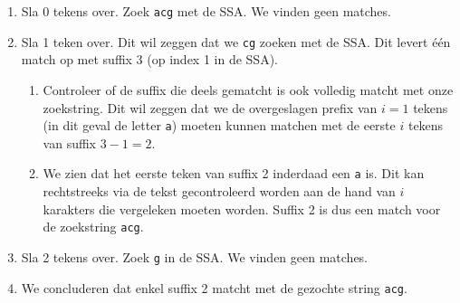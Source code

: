 \begin{enumerate}
    \item Sla 0 tekens over.
    Zoek \texttt{acg} met de SSA\@.
    We vinden geen matches.
    \item Sla 1 teken over.
    Dit wil zeggen dat we \texttt{cg} zoeken met de SSA\@.
    Dit levert één match op met suffix 3 (op index 1 in de SSA).
    \begin{enumerate}
        \item Controleer of de suffix die deels gematcht is ook volledig matcht met onze zoekstring.
        Dit wil zeggen dat we de overgeslagen prefix van $i = 1$ tekens (in dit geval de letter \texttt{a}) moeten kunnen matchen met de eerste $i$ tekens van suffix $3 - 1 = 2$.
        \item We zien dat het eerste teken van suffix 2 inderdaad een \texttt{a} is.
        Dit kan rechtstreeks via de tekst gecontroleerd worden aan de hand van $i$ karakters die vergeleken moeten worden.
        Suffix 2 is dus een match voor de zoekstring \texttt{acg}.
    \end{enumerate}
    \item Sla 2 tekens over.
    Zoek \texttt{g} in de SSA\@.
    We vinden geen matches.
    \item We concluderen dat enkel suffix 2 matcht met de gezochte string \texttt{acg}.
\end{enumerate}


